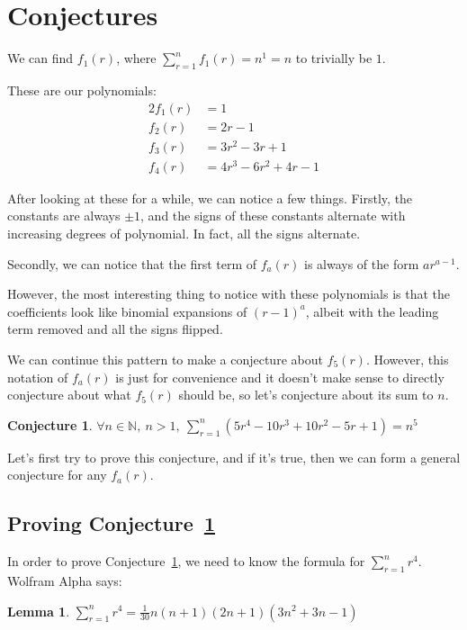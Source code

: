 \documentclass[a4paper]{article}
\newcommand{\sn}{\sum\limits_{r=1}^{n}}
\newcommand{\inn}{\in \mathbb{N}}
\newcommand{\oo}[1]{\frac{1}{#1}}
\newtheorem{lemma}{Lemma}
\newtheorem{conjecture}{Conjecture}
\begin{document}
\section{Conjectures}

We can find $f_1(r)$, where $\sn f_1(r) = n^1 = n$ to trivially be $1$.

These are our polynomials:
\begin{alignat*}{2}
f_1(r) &= 1\\[0.5em]
f_2(r) &= 2r - 1\\[0.5em]
f_3(r) &= 3r^2 - 3r + 1\\[0.5em]
f_4(r) &= 4r^3 - 6r^2 + 4r - 1
\end{alignat*}

After looking at these for a while, we can notice a few things. Firstly, the constants are always $\pm 1$, and the signs of these constants alternate with increasing degrees of polynomial. In fact, all the signs alternate.

Secondly, we can notice that the first term of $f_a(r)$ is always of the form $ar^{a-1}$.

However, the most interesting thing to notice with these polynomials is that the coefficients look like binomial expansions of $(r-1)^a$, albeit with the leading term removed and all the signs flipped.

We can continue this pattern to make a conjecture about $f_5(r)$. However, this notation of $f_a(r)$ is just for convenience and it doesn't make sense to directly conjecture about what $f_5(r)$ should be, so let's conjecture about its sum to $n$.
\begin{conjecture}
$\forall n \inn,\ n > 1,\ \sn (5r^4 - 10r^3 + 10r^2 - 5r + 1) = n^5$
\label{conj:f5}
\end{conjecture}

Let's first try to prove this conjecture, and if it's true, then we can form a general conjecture for any $f_a(r)$.

\subsection{Proving Conjecture~\ref{conj:f5}}

In order to prove Conjecture~\ref{conj:f5}, we need to know the formula for $\sn r^4$. Wolfram Alpha says:
\begin{lemma}
$\displaystyle \sn r^4 = \oo{30}n(n + 1)(2n + 1)\left(3n^2 + 3n - 1\right)$
\label{lem:sum_r4}
\end{lemma}
\end{document}
